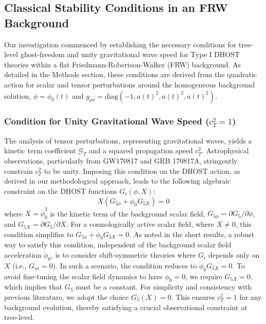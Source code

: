 \documentclass[twocolumn]{aastex631}
\begin{document}
\subsection{Classical Stability Conditions in an FRW Background}
Our investigation commenced by establishing the necessary conditions for tree-level ghost-freedom and unity gravitational wave speed for Type I DHOST theories within a flat Friedmann-Robertson-Walker (FRW) background. As detailed in the Methods section, these conditions are derived from the quadratic action for scalar and tensor perturbations around the homogeneous background solution, $\phi=\phi_0(t)$ and $g_{\mu\nu} = \text{diag}(-1, a(t)^2, a(t)^2, a(t)^2)$.

\subsubsection{Condition for Unity Gravitational Wave Speed ($c_T^2=1$)}
The analysis of tensor perturbations, representing gravitational waves, yields a kinetic term coefficient $\mathcal{G}_T$ and a squared propagation speed $c_T^2$. Astrophysical observations, particularly from GW170817 and GRB 170817A, stringently constrain $c_T^2$ to be unity. Imposing this condition on the DHOST action, as derived in our methodological approach, leads to the following algebraic constraint on the DHOST functions $G_i(\phi, X)$:
\begin{equation}
X(G_{5\phi} + \ddot{\phi}_0 G_{5X}) = 0
\end{equation}
where $X = \dot{\phi}_0^2$ is the kinetic term of the background scalar field, $G_{5\phi} = \partial G_5 / \partial \phi$, and $G_{5X} = \partial G_5 / \partial X$. For a cosmologically active scalar field, where $X \neq 0$, this condition simplifies to $G_{5\phi} + \ddot{\phi}_0 G_{5X} = 0$. As noted in the short results, a robust way to satisfy this condition, independent of the background scalar field acceleration $\ddot{\phi}_0$, is to consider shift-symmetric theories where $G_i$ depends only on $X$ (i.e., $G_{i\phi}=0$). In such a scenario, the condition reduces to $\ddot{\phi}_0 G_{5X} = 0$. To avoid fine-tuning the scalar field dynamics to have $\ddot{\phi}_0=0$, we require $G_{5X}=0$, which implies that $G_5$ must be a constant. For simplicity and consistency with previous literature, we adopt the choice $G_5(X) = 0$. This ensures $c_T^2=1$ for any background evolution, thereby satisfying a crucial observational constraint at tree-level.
\end{document}
